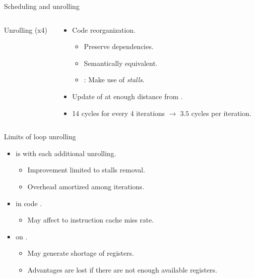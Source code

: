 \begin{frame}[t]{Scheduling and unrolling}

\begin{columns}

\begin{column}{.45\textwidth}
\begin{block}{Unrolling (x4)}

\end{block}
\end{column}

\begin{column}{.45\textwidth}
\begin{itemize}
  \item Code reorganization.
    \begin{itemize}
      \item Preserve dependencies.
      \item Semantically equivalent.
      \item {}: Make use of \emph{stalls}.
    \end{itemize}
  \item Update of  at enough distance from
        .
  \item 14 cycles for every 4 iterations $\rightarrow$ $3.5$ cycles per iteration.
\end{itemize}
\end{column}

\end{columns}

\end{frame}

\begin{frame}[t]{Limits of loop unrolling}
\begin{itemize}
  \item {} is  with each additional unrolling.
    \begin{itemize}
      \item Improvement limited to stalls removal.
      \item Overhead amortized among iterations.
    \end{itemize}

  \item {} in code .
    \begin{itemize}
      \item May affect to instruction cache miss rate.
    \end{itemize}

  \item {} on .
    \begin{itemize}
      \item May generate shortage of registers.
      \item Advantages are lost if there are not enough available registers.
    \end{itemize}

\end{itemize}
\end{frame}

